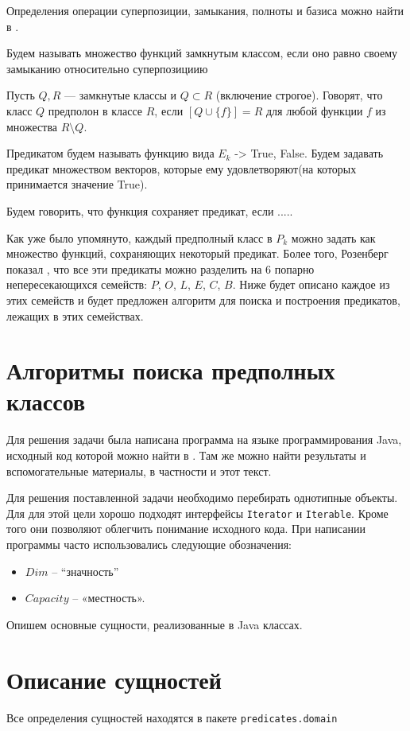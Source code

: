 \documentclass[a4paper,14pt]{extreport}
\begin{document}
Определения операции суперпозиции, замыкания, полноты и базиса можно найти в \cite{march}.

Будем называть множество функций замкнутым классом, если оно равно своему замыканию относительно суперпозициию

Пусть $Q, R$ — замкнутые классы и $Q \subset R$ (включение строгое). 
Говорят, что класс $Q$ предполон в классе $R$, если $[Q \cup \{f\}] = R$ для 
любой функции $f$ из множества $R \setminus Q$. 

Предикатом будем называть функцию вида $E_k$ -> {True, False}. Будем задавать предикат множеством векторов, которые ему удовлетворяют(на которых принимается значение True).

Будем говорить, что функция сохраняет предикат, если .....

Как уже было упомянуто, каждый предполный класс в $P_k$ можно задать как множество функций, сохраняющих некоторый предикат. Более того, Розенберг показал \cite{roz1, roz2}, что все эти предикаты можно разделить на 6 попарно непересекающихся семейств: $P$, $O$, $L$, $E$, $C$, $B$. Ниже будет описано каждое из этих семейств и будет предложен алгоритм для поиска и построения предикатов, лежащих в этих семействах.

\section{Алгоритмы поиска предполных классов}
Для решения задачи была написана программа на языке программирования Java, исходный код которой можно найти в \cite{git}. Там же можно найти результаты и вспомогательные материалы, в частности и этот текст.

Для решения поставленной задачи необходимо перебирать однотипные объекты. Для для этой цели хорошо подходят интерфейсы {\tt Iterator} и {\tt Iterable}. Кроме того они позволяют облегчить понимание исходного кода.
При написании программы часто использовались следующие обозначения:
\begin{itemize}
\item$Dim$ – “значность”
\item$Capacity$ – «местность».  
\end{itemize} 

Опишем основные сущности, реализованные в Java классах.

\section{Описание сущностей}
Все определения сущностей находятся в пакете {\tt predicates.domain}
\end{document}
